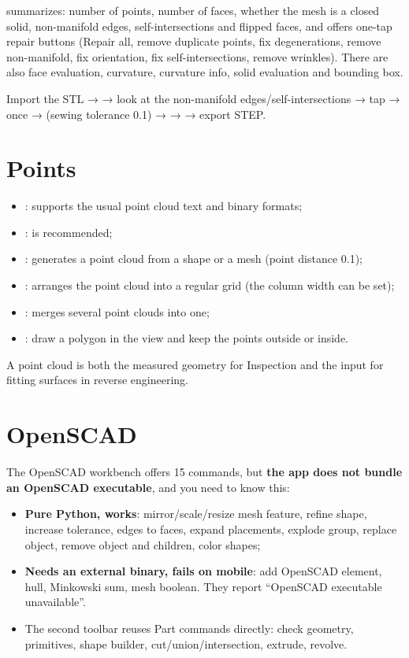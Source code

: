  summarizes: number of points, number of faces, whether the mesh is a closed solid,
non-manifold edges, self-intersections and flipped faces, and offers one-tap repair buttons (Repair
all, remove duplicate points, fix degenerations, remove non-manifold, fix orientation, fix
self-intersections, remove wrinkles). There are also face evaluation, curvature, curvature info,
solid evaluation and bounding box.

\begin{practice}
Import the STL →  → look at the non-manifold edges/self-intersections → tap
 →  once →  (sewing tolerance 0.1) →
 →  → export STEP.
\end{practice}

\section{Points}

\begin{itemize}
  \item {}: supports the usual point cloud text and binary formats;
  \item {}:  is recommended;
  \item {}: generates a point cloud from a shape or a mesh (point distance 0.1);
  \item {}: arranges the point cloud into a regular grid (the column width can be set);
  \item {}: merges several point clouds into one;
  \item {}: draw a polygon in the view and keep the points outside or inside.
\end{itemize}

A point cloud is both the measured geometry for Inspection and the input for fitting surfaces in
reverse engineering.

\section{OpenSCAD}

The OpenSCAD workbench offers 15 commands, but \textbf{the app does not bundle an OpenSCAD
executable}, and you need to know this:

\begin{itemize}
  \item \textbf{Pure Python, works}: mirror/scale/resize mesh feature, refine shape, increase
        tolerance, edges to faces, expand placements, explode group, replace object, remove object
        and children, color shapes;
  \item \textbf{Needs an external binary, fails on mobile}: add OpenSCAD element, hull, Minkowski
        sum, mesh boolean. They report ``OpenSCAD executable unavailable''.
  \item The second toolbar reuses Part commands directly: check geometry, primitives, shape builder,
        cut/union/intersection, extrude, revolve.
\end{itemize}

